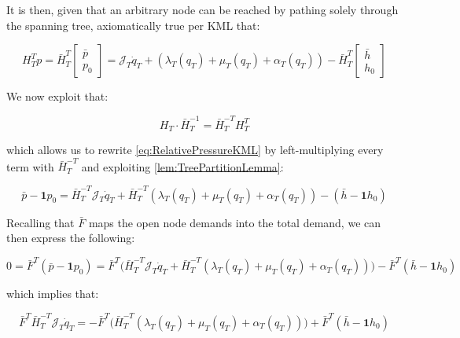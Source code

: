 It is then, given that an arbitrary node can be reached by pathing solely through the spanning tree, axiomatically true per KML that:

\begin{equation}\label{eq:RelativePressureKML}
	H_T^T p = 
	\bar{H}_T^T \begin{bmatrix} \bar{p} \\ p_0	\end{bmatrix} =
	\mathcal{J}_T\dot{q}_T + (\lambda_T(q_T)+\mu_T(q_T) + \alpha_T(q_T)) - 
	\bar{H}_T^T \begin{bmatrix} \bar{h} \\ h_0	\end{bmatrix}
\end{equation}

We now exploit that:

\begin{equation}\label{eq:TreeLemmaRewrite}
	H_T\cdot\bar{H}_T^{-1} = \bar{H}_T^{-T}H_T^T 
\end{equation}

which allows us to rewrite \cref{eq:RelativePressureKML} by left-multiplying every term with $\bar{H}_T^{-T}$ and exploiting \cref{lem:TreePartitionLemma}:

\begin{equation}\label{eq:RelativePressureKMLWithLemma}
	\bar{p} - \mathbf{1}p_0 =
	\bar{H}_T^{-T}\mathcal{J}_T\dot{q}_T + \bar{H}_T^{-T}(\lambda_T(q_T)+\mu_T(q_T) + \alpha_T(q_T)) - 
	(\bar{h} - \mathbf{1}h_0)
\end{equation}

Recalling that $\bar{F}$ maps the open node demands into the total demand, we can then express the following:

\begin{equation}\label{eq:RelativePressureLemmaAtmospheric}
	0 = \bar{F}^T(\bar{p} - \mathbf{1}p_0) =
	\bar{F}^T\Big(\bar{H}_T^{-T}\mathcal{J}_T\dot{q}_T + \bar{H}_T^{-T}(\lambda_T(q_T)+\mu_T(q_T) + \alpha_T(q_T))\Big) - 
	\bar{F}^T(\bar{h} - \mathbf{1}h_0)
\end{equation}

which implies that: 

\begin{equation}\label{eq:RelativePressureLemmaDiffEqForm}
	\bar{F}^T\bar{H}_T^{-T}\mathcal{J}_T\dot{q}_T = - \bar{F}^T\Big(\bar{H}_T^{-T}(\lambda_T(q_T)+\mu_T(q_T) + \alpha_T(q_T))\Big) + 
	\bar{F}^T(\bar{h} - \mathbf{1}h_0)
\end{equation}

